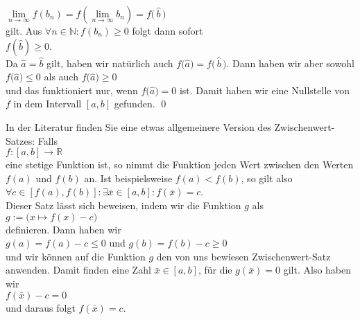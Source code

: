 \hspace*{1.3cm}
$\lim\limits_{n\rightarrow\infty} f(b_n) = f\left(\lim\limits_{n\rightarrow\infty}
  b_n\right) = f\bigl(\,\widehat{b}\,\bigr)$ 
\\[0.3cm]
gilt.  Aus $\forall n\in\mathbb{N}: f(b_n) \geq 0$ folgt dann sofort
\\[0.2cm]
\hspace*{1.3cm}
$f(\widehat{b}) \geq 0$.
\\[0.2cm]
Da $\widehat{a} = \widehat{b}$ gilt, haben wir nat\"urlich auch 
$f\bigl(\widehat{a}\bigr) = f\bigl(\,\widehat{b}\,\bigr)$.  Dann haben wir aber sowohl
\\[0.2cm]
\hspace*{1.3cm}
$f\bigl(\widehat{a}\bigr) \leq 0$ \quad als auch \quad $f\bigl(\widehat{a}\bigr) \geq 0$ 
\\[0.2cm]
und das funktioniert nur, wenn $f\bigl(\widehat{a}\bigr) = 0$ ist.  Damit haben wir eine
Nullstelle von $f$ in dem Intervall $[a,b]$ gefunden.
\qed

\remark
In der Literatur finden Sie eine etwas allgemeinere Version des Zwischenwert-Satzes: Falls
\\[0.2cm]
\hspace*{1.3cm}
$f:[a,b] \rightarrow \mathbb{R}$
\\[0.2cm]  
eine stetige Funktion ist, so nimmt die Funktion jeden Wert zwischen den Werten $f(a)$ und $f(b)$ an.
Ist beispielsweise $f(a) < f(b)$, so gilt also
\\[0.2cm]
\hspace*{1.3cm}
$\forall c \in [f(a), f(b)]: \exists \bar{x} \in [a,b]: f(\bar{x}) = c$.
\\[0.2cm]
Dieser Satz l\"asst sich beweisen, indem wir die Funktion $g$ als
\\[0.2cm]
\hspace*{1.3cm}
$g := \bigl(x \mapsto f(x) - c\bigr)$
\\[0.2cm]
definieren.  Dann haben wir
\\[0.2cm]
\hspace*{1.3cm}
$g(a) = f(a) - c \leq 0$ \quad und \quad $g(b) = f(b) - c \geq 0$
\\[0.2cm]
und wir k\"onnen auf die Funktion $g$ den von uns bewiesen Zwischenwert-Satz anwenden.  Damit finden
eine Zahl $\bar{x} \in [a,b]$, f\"ur die $g(\bar{x}) = 0$ gilt.  Also haben wir
\\[0.2cm]
\hspace*{1.3cm}
$f(\bar{x}) -c = 0$
\\[0.2cm]
und daraus folgt $f(\bar{x}) = c$.  \eox

